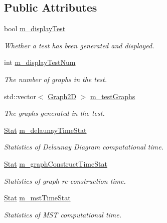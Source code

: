 \subsection*{Public Attributes}
\begin{DoxyCompactItemize}
\item 
bool \hyperlink{structcmst_1_1_window_1_1_test_a6e01140b018e7c479b15ae6499d8b9e8}{m\+\_\+display\+Test}
\begin{DoxyCompactList}\small\item\em Whether a test has been generated and displayed. \end{DoxyCompactList}\item 
int \hyperlink{structcmst_1_1_window_1_1_test_a0968826c727c33df28c160c4095e0b2f}{m\+\_\+display\+Test\+Num}
\begin{DoxyCompactList}\small\item\em The number of graphs in the test. \end{DoxyCompactList}\item 
std\+::vector$<$ \hyperlink{classcmst_1_1_graph2_d}{Graph2D} $>$ \hyperlink{structcmst_1_1_window_1_1_test_a42f44814c524399a3c1f547a64218c1a}{m\+\_\+test\+Graphs}
\begin{DoxyCompactList}\small\item\em The graphs generated in the test. \end{DoxyCompactList}\item 
\hyperlink{classcmst_1_1_stat}{Stat} \hyperlink{structcmst_1_1_window_1_1_test_a6f0ad01079d1c5b149282e31db771772}{m\+\_\+delaunay\+Time\+Stat}
\begin{DoxyCompactList}\small\item\em Statistics of Delaunay Diagram computational time. \end{DoxyCompactList}\item 
\hyperlink{classcmst_1_1_stat}{Stat} \hyperlink{structcmst_1_1_window_1_1_test_a4ff72191889ff43d7d80517120a97fae}{m\+\_\+graph\+Construct\+Time\+Stat}
\begin{DoxyCompactList}\small\item\em Statistics of graph re-\/construction time. \end{DoxyCompactList}\item 
\hyperlink{classcmst_1_1_stat}{Stat} \hyperlink{structcmst_1_1_window_1_1_test_a103594f227a761c33c06b8dd68713c18}{m\+\_\+mst\+Time\+Stat}
\begin{DoxyCompactList}\small\item\em Statistics of M\+ST computational time. \end{DoxyCompactList}\end{DoxyCompactItemize}


